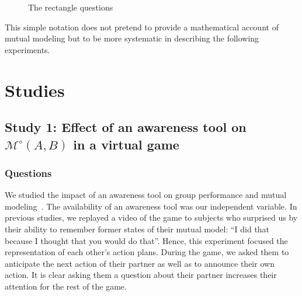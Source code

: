 \documentclass[twocolumn]{article}
\newcommand{\Model}[3]{{$\mathcal{M}^{\circ}(#1, #2, #3)$}}
\newcommand{\gModel}[2]{{$\mathcal{M}^{\circ}(#1, #2)$}}
\begin{document}
\begin{figure}[htb]
\centering


\caption{The rectangle questions}

\label{mm_rectangle}
\end{figure}


This simple notation does not pretend to provide a mathematical account of
mutual modeling but to be more systematic in describing the following
experiments. 





\section{Studies}



\subsection{Study 1: Effect of an awareness tool on \gModel{A}{B} in a virtual
game}

\subsubsection*{Questions}

We studied the impact of an awareness tool on group performance and mutual
modeling~\cite{nova2007collaboration}. The availability
of an awareness tool was our independent variable. In previous studies, we
replayed a video of the game to subjects who surprised us by their ability to
remember former states of their mutual model: ``I did that because I thought that
you would do that''. Hence, this experiment focused the representation of each
other's action plans. During the game, we asked them to anticipate the next
action of their partner as well as to announce their own action. It is clear
asking them a question about their partner increases their attention for the
rest of the game.
\end{document}
